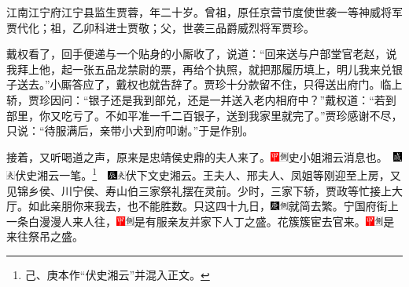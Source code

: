 江南江宁府江宁县监生贾蓉，年二十岁。曾祖，原任京营节度使世袭一等神威将军贾代化；祖，乙卯科进士贾敬；父，世袭三品爵威烈将军贾珍。

戴权看了，回手便递与一个贴身的小厮收了，说道：“回来送与户部堂官老赵，说我拜上他，起一张五品龙禁尉的票，再给个执照，就把那履历填上，明儿我来兑银子送去。”小厮答应了，戴权也就告辞了。贾珍十分款留不住，只得送出府门。临上轿，贾珍因问：“银子还是我到部兑，还是一并送入老内相府中？”戴权道：“若到部里，你又吃亏了。不如平准一千二百银子，送到我家里就完了。”贾珍感谢不尽，只说：“待服满后，亲带小犬到府叩谢。”于是作别。

接着，又听喝道之声，原来是忠靖侯史鼎的夫人来了。{{\includegraphics[width=3mm]{../Images/00002}\includegraphics[width=3mm]{../Images/00011}\footnotesize \kaishu 史小姐湘云消息也。}　\includegraphics[width=3mm]{../Images/00005}\includegraphics[width=3mm]{../Images/00012}\footnotesize \kaishu 伏史湘云一笔。}\footnote{己、庚本作“伏史湘云”并混入正文。}{　\includegraphics[width=3mm]{../Images/00009}\includegraphics[width=3mm]{../Images/00012}\footnotesize \kaishu 伏下文史湘云。}王夫人、邢夫人、凤姐等刚迎至上房，又见锦乡侯、川宁侯、寿山伯三家祭礼摆在灵前。少时，三家下轿，贾政等忙接上大厅。如此亲朋你来我去，也不能胜数。只这四十九日，{\includegraphics[width=3mm]{../Images/00004}\includegraphics[width=3mm]{../Images/00011}\footnotesize \kaishu 就简去繁。}宁国府街上一条白漫漫人来人往，{\includegraphics[width=3mm]{../Images/00002}\includegraphics[width=3mm]{../Images/00011}\footnotesize \kaishu 是有服亲友并家下人丁之盛。}花簇簇宦去官来。{\includegraphics[width=3mm]{../Images/00002}\includegraphics[width=3mm]{../Images/00011}\footnotesize \kaishu 是来往祭吊之盛。}

